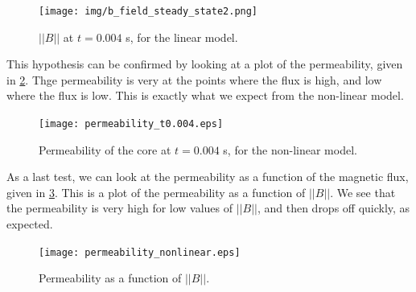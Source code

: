 \begin{figure}
    \centering
    \texttt{[image: img/b\_field\_steady\_state2.png]}
    \caption{$||B||$ at $t = 0.004$ s, for the linear model.}
    \label{fig:steady_state}
\end{figure}


This hypothesis can be confirmed by looking at a plot of the permeability, given in \cref{fig:nonlinear_permeability}. Thge permeability is very at the points where the flux is high, and low where the flux is low. This is exactly what we expect from the non-linear model.

\begin{figure}
    \centering
    \texttt{[image: permeability\_t0.004.eps]}
    \caption{Permeability of the core at $t = 0.004$ s, for the non-linear model.}
    \label{fig:nonlinear_permeability}
\end{figure}


As a last test, we can look at the permeability as a function of the magnetic flux, given in \cref{fig:nonlinear_permeability_bnorm}. This is a plot of the permeability as a function of $||B||$. We see that the permeability is very high for low values of $||B||$, and then drops off quickly, as expected.

\begin{figure}
    \centering
    \texttt{[image: permeability\_nonlinear.eps]}
    \caption{Permeability as a function of $||B||$.}
    \label{fig:nonlinear_permeability_bnorm}
\end{figure}





